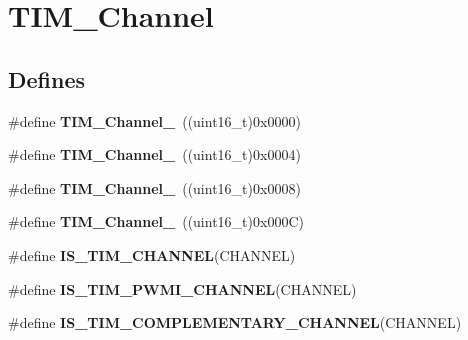 \hypertarget{group__TIM__Channel}{
\section{TIM\_\-Channel}
\label{group__TIM__Channel}
}
\subsection*{Defines}
\begin{DoxyCompactItemize}
\item 
\hypertarget{group__TIM__Channel_ga69ea7f558f02c63dd1082d784d2449bd}{
\#define {\bfseries TIM\_\-Channel\_}~((uint16\_\-t)0x0000)}
\label{group__TIM__Channel_ga69ea7f558f02c63dd1082d784d2449bd}

\item 
\hypertarget{group__TIM__Channel_ga03d7da8269a87a560f68985b4bd80931}{
\#define {\bfseries TIM\_\-Channel\_}~((uint16\_\-t)0x0004)}
\label{group__TIM__Channel_ga03d7da8269a87a560f68985b4bd80931}

\item 
\hypertarget{group__TIM__Channel_ga012711b19e8c91f6f352801a3dc0bcc9}{
\#define {\bfseries TIM\_\-Channel\_}~((uint16\_\-t)0x0008)}
\label{group__TIM__Channel_ga012711b19e8c91f6f352801a3dc0bcc9}

\item 
\hypertarget{group__TIM__Channel_ga7414888c40d066af235bc1f80b99bd9d}{
\#define {\bfseries TIM\_\-Channel\_}~((uint16\_\-t)0x000C)}
\label{group__TIM__Channel_ga7414888c40d066af235bc1f80b99bd9d}

\item 
\#define {\bfseries IS\_\-TIM\_\-CHANNEL}(CHANNEL)
\item 
\#define {\bfseries IS\_\-TIM\_\-PWMI\_\-CHANNEL}(CHANNEL)
\item 
\#define {\bfseries IS\_\-TIM\_\-COMPLEMENTARY\_\-CHANNEL}(CHANNEL)
\end{DoxyCompactItemize}


